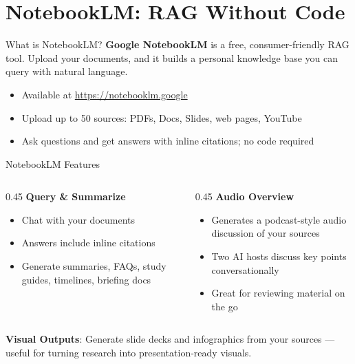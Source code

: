 \documentclass[aspectratio=169]{beamer}
\begin{document}
\section{NotebookLM: RAG Without Code}

\begin{frame}{What is NotebookLM?}
\textbf{Google NotebookLM} is a free, consumer-friendly RAG tool. Upload your documents, and it builds a personal knowledge base you can query with natural language.
\vspace{0.3cm}
\begin{itemize}
  \item Available at \url{https://notebooklm.google}
  \item Upload up to 50 sources: PDFs, Docs, Slides, web pages, YouTube
  \item Ask questions and get answers with \alert{inline citations}; no code required
\end{itemize}
\end{frame}

\begin{frame}{NotebookLM Features}
\begin{columns}[T]
\begin{column}{0.45\textwidth}
\textbf{Query \& Summarize}
\begin{itemize}\small
  \item Chat with your documents
  \item Answers include inline citations
  \item Generate summaries, FAQs, study guides, timelines, briefing docs
\end{itemize}
\end{column}
\begin{column}{0.45\textwidth}
\textbf{Audio Overview}
\begin{itemize}\small
  \item Generates a podcast-style audio discussion of your sources
  \item Two AI hosts discuss key points conversationally
  \item Great for reviewing material on the go
\end{itemize}
\end{column}
\end{columns}
\vspace{0.3cm}
\textbf{Visual Outputs}: Generate slide decks and infographics from your sources --- useful for turning research into presentation-ready visuals.
\end{frame}
\end{document}
